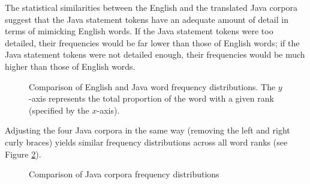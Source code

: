 \documentclass[runningheads,a4paper]{llncs}
\begin{document}
The statistical similarities between the English and the translated Java
corpora suggest that the Java statement tokens have an adequate amount of
detail in terms of mimicking English words. If the Java statement tokens
were too detailed, their frequencies would be far lower than those of English
words; if the Java statement tokens were not detailed enough, their
frequencies would be much higher than those of English words.

\begin{figure}
\caption{Comparison of English and Java word frequency distributions.
    The $y$-axis represents the total proportion of the word with a given
    rank (specified by the $x$-axis).}
\label{english-frequency}
\end{figure}
 
Adjusting the four Java corpora in the same way (removing the left and right
curly braces) yields similar frequency distributions across all word ranks
(see Figure \ref{java-frequency}).
 
\begin{figure}
\caption{Comparison of Java corpora frequency distributions}
\label{java-frequency}
\end{figure}
\end{document}
